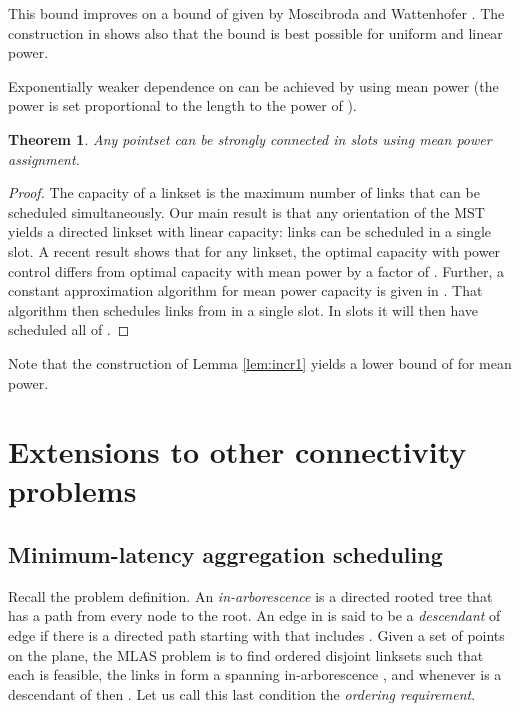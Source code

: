\documentclass[11pt]{amsart}
\newcounter{foo}
\newtheorem{theorem}[foo]{Theorem}
\begin{document}
This bound improves on a bound of  given by Moscibroda
and Wattenhofer \cite{MoWa06}. The construction in \cite{MoWa06} shows
also that the bound is best possible for uniform and linear power.

Exponentially weaker dependence on  can be achieved by using
mean power (the power is set proportional to the length to the power of ).

\begin{theorem}
Any pointset can be strongly connected in  slots using mean power assignment.
\label{loglogdelta}
\end{theorem}


\begin{proof}
The capacity of a linkset is the maximum number of links that can be
scheduled simultaneously.  Our main result is that any orientation of
the MST  yields a directed linkset with linear capacity:  
links can be scheduled in a single slot. 
A recent result \cite{SODA11} shows that for any linkset, the
optimal capacity with power control differs from optimal capacity with
mean power by a factor of .
Further, a constant approximation algorithm for mean power capacity is
given in \cite{SODA11}. That algorithm then schedules  links from  in a single slot. 
In  slots it will then have
scheduled all of .
\end{proof}


Note that the construction of Lemma \ref{lem:incr1} yields a lower
bound of  for mean power.

\section{Extensions to other connectivity problems}
\label{sec:design}

\subsection{Minimum-latency aggregation scheduling}

Recall the problem definition.  An \emph{in-arborescence}  is a
directed rooted tree that has a path from every node to the root. An
edge  in  is said to be a \emph{descendant} of edge  if
there is a directed path starting with  that includes .
Given a set of  points  on the plane, 
the MLAS problem is to
find  ordered disjoint linksets   such that
each  is feasible, the links in  form a spanning in-arborescence , and whenever  is a descendant of  then . Let us call this last condition the 
\emph{ordering requirement}.
\end{document}
